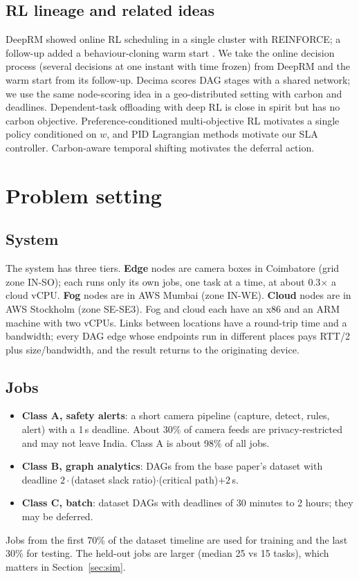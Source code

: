 \documentclass[11pt,a4paper]{article}
\begin{document}
\subsection{RL lineage and related ideas}
DeepRM \cite{deeprm} showed online RL scheduling in a single cluster with REINFORCE; a follow-up added a behaviour-cloning warm start \cite{deeprm2}. We take the online decision process (several decisions at one instant with time frozen) from DeepRM and the warm start from its follow-up. Decima \cite{decima} scores DAG stages with a shared network; we use the same node-scoring idea in a geo-distributed setting with carbon and deadlines. Dependent-task offloading with deep RL \cite{wang2021} is close in spirit but has no carbon objective. Preference-conditioned multi-objective RL \cite{abels2019,yang2019} motivates a single policy conditioned on $w$, and PID Lagrangian methods \cite{stooke2020,ray2019} motivate our SLA controller. Carbon-aware temporal shifting \cite{wiesner2021} motivates the deferral action.

\section{Problem setting}\label{sec:problem}

\subsection{System}
The system has three tiers. \textbf{Edge} nodes are camera boxes in Coimbatore (grid zone IN-SO); each runs only its own jobs, one task at a time, at about 0.3$\times$ a cloud vCPU. \textbf{Fog} nodes are in AWS Mumbai (zone IN-WE). \textbf{Cloud} nodes are in AWS Stockholm (zone SE-SE3). Fog and cloud each have an x86 and an ARM machine with two vCPUs. Links between locations have a round-trip time and a bandwidth; every DAG edge whose endpoints run in different places pays RTT/2 plus size/bandwidth, and the result returns to the originating device.

\subsection{Jobs}
\begin{itemize}
\item \textbf{Class A, safety alerts}: a short camera pipeline (capture, detect, rules, alert) with a 1\,s deadline. About 30\% of camera feeds are privacy-restricted and may not leave India. Class A is about 98\% of all jobs.
\item \textbf{Class B, graph analytics}: DAGs from the base paper's dataset with deadline $2\cdot$(dataset slack ratio)$\cdot$(critical path)$+2$\,s.
\item \textbf{Class C, batch}: dataset DAGs with deadlines of 30 minutes to 2 hours; they may be deferred.
\end{itemize}
Jobs from the first 70\% of the dataset timeline are used for training and the last 30\% for testing. The held-out jobs are larger (median 25 vs 15 tasks), which matters in Section~\ref{sec:sim}.
\end{document}
